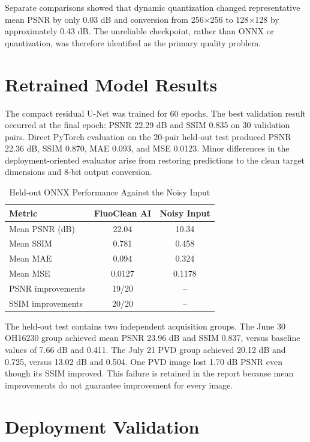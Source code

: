 \documentclass[12pt,a4paper]{report}
\begin{document}
Separate comparisons showed that dynamic quantization changed representative mean PSNR by only 0.03 dB and conversion from 256$\times$256 to 128$\times$128 by approximately 0.43 dB. The unreliable checkpoint, rather than ONNX or quantization, was therefore identified as the primary quality problem.

\section{Retrained Model Results}

The compact residual U-Net was trained for 60 epochs. The best validation result occurred at the final epoch: PSNR 22.29 dB and SSIM 0.835 on 30 validation pairs. Direct PyTorch evaluation on the 20-pair held-out test produced PSNR 22.36 dB, SSIM 0.870, MAE 0.093, and MSE 0.0123. Minor differences in the deployment-oriented evaluator arise from restoring predictions to the clean target dimensions and 8-bit output conversion.

\begin{table}[H]
\centering
\caption{Held-out ONNX Performance Against the Noisy Input}
\label{tab:validated_metrics}
\begin{tabular}{|l|c|c|}
\hline
\textbf{Metric} & \textbf{FluoClean AI} & \textbf{Noisy Input} \\
\hline
Mean PSNR (dB) & 22.04 & 10.34 \\
Mean SSIM & 0.781 & 0.458 \\
Mean MAE & 0.094 & 0.324 \\
Mean MSE & 0.0127 & 0.1178 \\
PSNR improvements & 19/20 & -- \\
SSIM improvements & 20/20 & -- \\
\hline
\end{tabular}
\end{table}

The held-out test contains two independent acquisition groups. The June 30 OH16230 group achieved mean PSNR 23.96 dB and SSIM 0.837, versus baseline values of 7.66 dB and 0.411. The July 21 PVD group achieved 20.12 dB and 0.725, versus 13.02 dB and 0.504. One PVD image lost 1.70 dB PSNR even though its SSIM improved. This failure is retained in the report because mean improvements do not guarantee improvement for every image.

\section{Deployment Validation}
\end{document}
